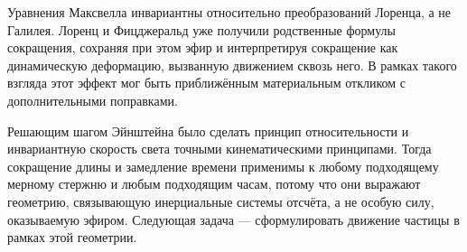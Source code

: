 \begin{classroomqa}
\end{classroomqa}

Уравнения Максвелла инвариантны относительно преобразований Лоренца, а не Галилея. Лоренц и Фицджеральд уже получили родственные формулы сокращения, сохраняя при этом эфир и интерпретируя сокращение как динамическую деформацию, вызванную движением сквозь него. В рамках такого взгляда этот эффект мог быть приближённым материальным откликом с дополнительными поправками.

Решающим шагом Эйнштейна было сделать принцип относительности и инвариантную скорость света точными кинематическими принципами. Тогда сокращение длины и замедление времени применимы к любому подходящему мерному стержню и любым подходящим часам, потому что они выражают геометрию, связывающую инерциальные системы отсчёта, а не особую силу, оказываемую эфиром. Следующая задача — сформулировать движение частицы в рамках этой геометрии.
